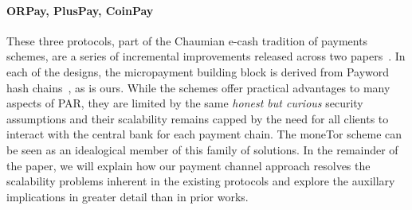 \paragraph*{ORPay, PlusPay, CoinPay} These three protocols, part of the
Chaumian e-cash tradition of payments schemes, are a series of incremental
improvements released across two papers~\cite{chen2009xpay,
  carbunar2012tipping}. In each of the designs, the micropayment building block
is derived from Payword hash chains~\cite{rivest1996payword}, as is ours. While
the schemes offer practical advantages to many aspects of PAR, they are limited
by the same \emph{honest but curious} security assumptions and their scalability
remains capped by the need for all clients to interact with the central bank for
each payment chain. The moneTor scheme can be seen as an idealogical member of
this family of solutions. In the remainder of the paper, we will explain how our
payment channel approach resolves the scalability problems inherent in the
existing protocols and explore the auxillary implications in greater detail than
in prior works.


